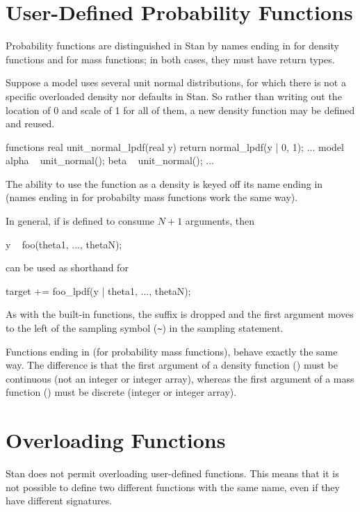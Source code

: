 \section{User-Defined Probability Functions}

Probability functions are distinguished in Stan by names ending in
 for density functions and  for mass
functions; in both cases, they must have  return types.

Suppose a model uses several unit normal distributions, for which
there is not a specific overloaded density nor defaults in Stan.  So
rather than writing out the location of 0 and scale of 1 for all of
them, a new density function may be defined and reused.
%
\begin{stancode}
functions {
  real unit_normal_lpdf(real y) { 
    return normal_lpdf(y | 0, 1); 
  }
}
...
model {
  alpha ~ unit_normal();
  beta ~ unit_normal();
  ...
}
\end{stancode}
%
The ability to use the  function as a density is
keyed off its name ending in  (names ending in
 for probabilty mass functions work the same way).  

In general, if  is defined to consume $N + 1$
arguments, then
%
\begin{stancode}
y ~ foo(theta1, ..., thetaN);
\end{stancode}
%
can be used as shorthand for 
%
\begin{stancode}
target += foo_lpdf(y | theta1, ..., thetaN);
\end{stancode}
%
As with the built-in functions, the suffix  is dropped and
the first argument moves to the left of the sampling symbol (\Verb|~|)
in the sampling statement.  

Functions ending in  (for probability mass functions),
behave exactly the same way.  The difference is that the first
argument of a density function () must be continuous (not
an integer or integer array), whereas the first argument of a mass
function () must be discrete (integer or integer array).


\section{Overloading Functions}

Stan does not permit overloading user-defined functions.  This means
that it is not possible to define two different functions with the
same name, even if they have different signatures.

